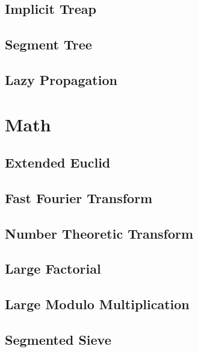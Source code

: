 \subsection{Implicit Treap}
\raggedbottom
\hrulefill
\subsection{Segment Tree}
\raggedbottom
\hrulefill
\subsection{Lazy Propagation}
\raggedbottom
\hrulefill

\section{Math}
\subsection{Extended Euclid}
\raggedbottom
\hrulefill
\subsection{Fast Fourier Transform}
\raggedbottom
\hrulefill
\subsection{Number Theoretic Transform}
\raggedbottom
\hrulefill
\subsection{Large Factorial}
\raggedbottom
\hrulefill
\subsection{Large Modulo Multiplication}
\raggedbottom
\hrulefill
\subsection{Segmented Sieve}
\raggedbottom
\hrulefill
